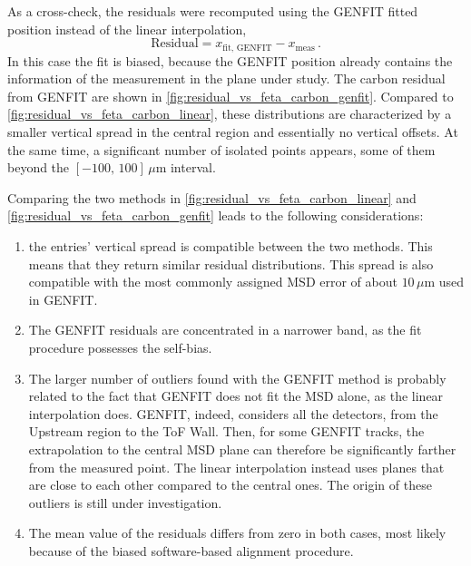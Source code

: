 As a cross-check, the residuals were recomputed using the GENFIT fitted position instead of the linear interpolation,
\begin{equation}
	\mathrm{Residual} = x_{\mathrm{fit,\,GENFIT}}-x_{\mathrm{meas}}\,.
\end{equation}
In this case the fit is biased, because the GENFIT position already contains the information of the measurement in the plane under study. The carbon residual from GENFIT are shown in \autoref{fig:residual_vs_feta_carbon_genfit}. Compared to \autoref{fig:residual_vs_feta_carbon_linear}, these distributions are characterized by a smaller vertical spread in the central region and essentially no vertical offsets. At the same time, a significant number of isolated points appears, some of them beyond the $[-100,\,100]\,\mu\mathrm{m}$ interval.

Comparing the two methods in \autoref{fig:residual_vs_feta_carbon_linear} and \autoref{fig:residual_vs_feta_carbon_genfit} leads to the following considerations:
\begin{enumerate}
	\item the entries' vertical spread is compatible between the two methods. This means that they return similar residual distributions. This spread is also compatible with the most commonly assigned MSD error of about $10\,\mu\mathrm{m}$ used in GENFIT.
	\item The GENFIT residuals are concentrated in a narrower band, as the fit procedure possesses the self-bias.
	\item The larger number of outliers found with the GENFIT method is probably related to the fact that GENFIT does not fit the MSD alone, as the linear interpolation does. GENFIT, indeed, considers all the detectors, from the Upstream region to the ToF Wall. Then, for some GENFIT tracks, the extrapolation to the central MSD plane can therefore be significantly farther from the measured point. The linear interpolation instead uses planes that are close to each other compared to the central ones. The origin of these outliers is still under investigation.
	\item The mean value of the residuals differs from zero in both cases, most likely because of the biased software-based alignment procedure.
\end{enumerate}

